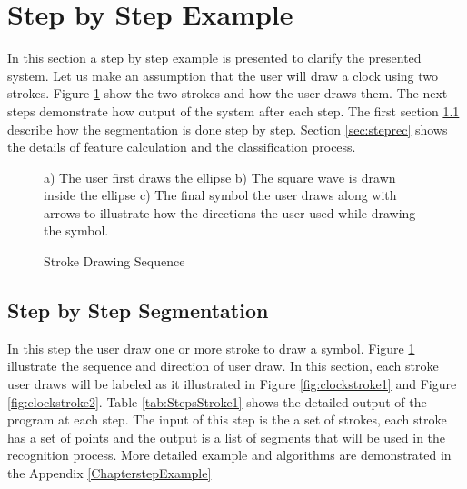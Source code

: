 

\section{Step by Step Example}
\label{secstepExample}
In this section a step by step example is presented to clarify the presented system. Let us make an assumption that the user will draw a clock using two strokes. Figure \ref{fig:clock} show the two strokes and how the user draws them. The next steps demonstrate how output of the system after each step. The first section \ref{sec:stepseg} describe how the segmentation is done step by step. Section \ref{sec:steprec} shows the details of feature calculation and the classification process. 
\begin{figure}
	\centering
	\caption{Stroke Drawing Sequence} a) The user first draws the ellipse b) The square wave is drawn inside the ellipse c) The final symbol the user draws along with arrows to illustrate how the directions the user used while drawing the symbol. 
	\label{fig:clock}
\end{figure}

\subsection{Step by Step Segmentation}
\label{sec:stepseg}

In this step the user draw one or more stroke to draw a symbol. Figure \ref{fig:clock} illustrate the sequence and direction of user draw. In this section, each stroke user draws will be labeled as it illustrated in Figure \ref{fig:clockstroke1} and Figure \ref{fig:clockstroke2}.  Table \ref{tab:StepsStroke1} shows the detailed output of the program at each step. The input of this step is the a set of strokes, each stroke has a set of  points and the output is a list of segments that will be used in the recognition process. More detailed example and algorithms are demonstrated in the Appendix \ref{ChapterstepExample} \\

